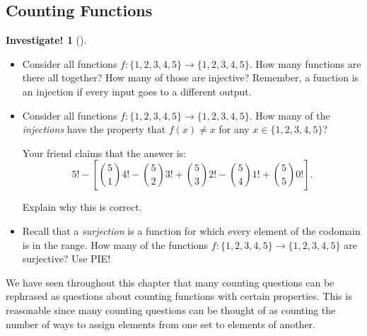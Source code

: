 \documentclass[10pt,]{book}
\theoremstyle{plain}
\theoremstyle{definition}
\theoremstyle{definition}
\theoremstyle{definition}
\newtheorem{investigation}[project]{Investigate!}
\theoremstyle{definition}
\numberwithin{equation}{chapter}
\begin{document}
\subsection[{Counting Functions}]{Counting Functions}\label{subsection-22}
\begin{investigation}[]\label{investigation-9}
\hypertarget{p-982}{}%
%
\begin{itemize}[label=\textbullet]
\item{}\hypertarget{p-983}{}%
Consider all functions \(f: \{1,2,3,4,5\} \to \{1,2,3,4,5\}\). How many functions are there all together? How many of those are injective? Remember, a function is an injection if every input goes to a different output.%
\item{}\hypertarget{p-984}{}%
Consider all functions \(f: \{1,2,3,4,5\} \to \{1,2,3,4,5\}\). How many of the \emph{injections} have the property that \(f(x) \ne x\) for any \(x \in \{1,2,3,4,5\}\)?%
\par
\hypertarget{p-985}{}%
Your friend claims that the answer is:%
\begin{equation*}
5! - \left[ {5\choose 1}4! - {5 \choose 2}3! + {5\choose 3}2! - {5 \choose 4}1! + {5\choose 5}0! \right].
\end{equation*}
%
\par
\hypertarget{p-986}{}%
Explain why this is correct.%
\item{}\hypertarget{p-987}{}%
Recall that a \emph{surjection} is a function for which every element of the codomain is in the range. How many of the functions \(f: \{1,2,3,4,5\} \to \{1,2,3,4,5\}\) are surjective? Use PIE!%
\end{itemize}
%
\end{investigation}
\hypertarget{p-988}{}%
We have seen throughout this chapter that many counting questions can be rephrased as questions about counting functions with certain properties.  This is reasonable since many counting questions can be thought of as counting the number of ways to assign elements from one set to elements of another.%
\end{document}
